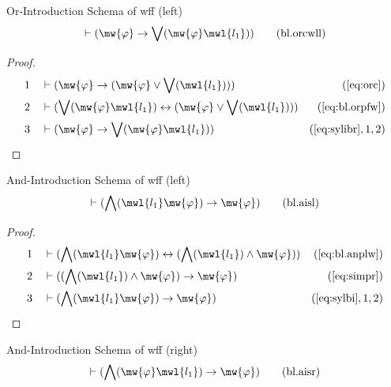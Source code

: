 \begin{lemma} Or-Introduction Schema of wff (left)
\begin{align}
\vdash ( \mw{\varphi} \rightarrow \bigvee( \mw{\varphi} \mwl{l_1} )
    )\label{eq:bl.orcwll}\tag{bl.orcwll}
\end{align}
\end{lemma}

\begin{proof}
\begin{align}
  1 &&  & \vdash ( \mw{\varphi} \rightarrow ( \mw{\varphi} \vee \bigvee( \mwl{l_1} ) ) )&(\mbox{\ref{eq:orc}})\notag
  \\ 2 &&  & \vdash ( \bigvee( \mw{\varphi} \mwl{l_1} ) \leftrightarrow ( \mw{\varphi} \vee \bigvee( \mwl{l_1} ) ) )&(\mbox{\ref{eq:bl.orpfw}})\notag
  \\ 3 &&  & \vdash ( \mw{\varphi} \rightarrow \bigvee( \mw{\varphi} \mwl{l_1} ) )&(\mbox{\ref{eq:sylibr}},1,2)\notag
\end{align}
\end{proof}

\begin{lemma} And-Introduction Schema of wff (left)
\begin{align}
\vdash ( \bigwedge( \mwl{l_1} \mw{\varphi} ) \rightarrow \mw{\varphi}
    )\label{eq:bl.aisl}\tag{bl.aisl}
\end{align}
\end{lemma}

\begin{proof}
\begin{align}
  1 &&  & \vdash ( \bigwedge( \mwl{l_1} \mw{\varphi} ) \leftrightarrow ( \bigwedge( \mwl{l_1} ) \wedge \mw{\varphi} ) )&(\mbox{\ref{eq:bl.anplw}})\notag
  \\ 2 &&  & \vdash ( ( \bigwedge( \mwl{l_1} ) \wedge \mw{\varphi} ) \rightarrow \mw{\varphi} )&(\mbox{\ref{eq:simpr}})\notag
  \\ 3 &&  & \vdash ( \bigwedge( \mwl{l_1} \mw{\varphi} ) \rightarrow \mw{\varphi} )&(\mbox{\ref{eq:sylbi}},1,2)\notag
\end{align}
\end{proof}

\begin{lemma} And-Introduction Schema of wff (right)
\begin{align}
\vdash ( \bigwedge( \mw{\varphi} \mwl{l_1} ) \rightarrow \mw{\varphi}
    )\label{eq:bl.aisr}\tag{bl.aisr}
\end{align}
\end{lemma}

